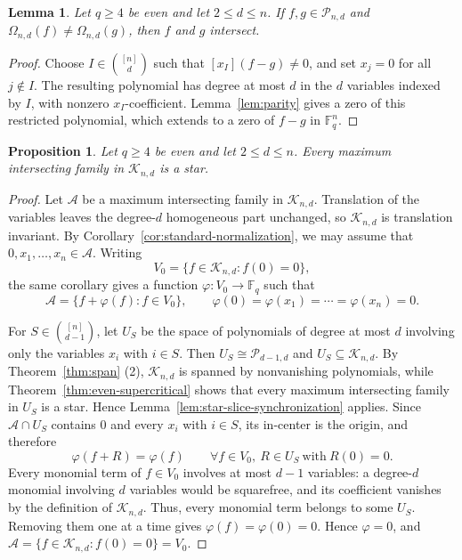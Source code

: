 \documentclass[12pt,reqno]{amsart}
\newtheorem{lem}[thm]{Lemma}
\newtheorem{prop}[thm]{Proposition}
\theoremstyle{definition}
\newcommand{\F}{\mathbb{F}}
\newcommand{\cA}{\mathcal A}
\newcommand{\cP}{\mathcal P}
\begin{document}
\begin{lem}
\label{lem:even-distinct-fibers}
Let $q\geq 4$ be even and let $2\leq d \leq n$. 
If $f,g\in\cP_{n,d}$ and $\Omega_{n,d}(f)\neq\Omega_{n,d}(g)$, then $f$ and
$g$ intersect.
\end{lem}

\begin{proof}
Choose $I\in\binom{[n]}{d}$ such that $[x_I](f-g)\neq0$, and set $x_j=0$ for all $j\notin I$. The resulting polynomial has
degree at most $d$ in the $d$ variables indexed by $I$, with nonzero $x_I$-coefficient. Lemma~\ref{lem:parity} gives a zero of this
restricted polynomial, which extends to a zero of $f-g$ in $\F_q^n$.
\end{proof}


\begin{prop}
\label{prop:even-fiber-rigidity}
Let $q\geq4$ be even and let $2\leq d\leq n$. Every maximum
intersecting family in $\mathcal K_{n,d}$ is a star.
\end{prop}

\begin{proof}
Let $\cA$ be a maximum intersecting family in $\mathcal K_{n,d}$. Translation of the variables leaves the degree-$d$ homogeneous part unchanged, so $\mathcal K_{n,d}$ is translation invariant. By Corollary~\ref{cor:standard-normalization}, we may assume that $0,x_1,\ldots,x_n\in\cA$. Writing
\[
V_0=\{f\in\mathcal K_{n,d}:f(0)=0\},
\]
the same corollary gives a function
$\varphi\colon V_0\to\F_q$ such that
\[
\cA=\{f+\varphi(f):f\in V_0\},
  \qquad \varphi(0)=\varphi(x_1)=\cdots=\varphi(x_n)=0.
\]

For $S\in\binom{[n]}{d-1}$, let $U_S$ be the space of polynomials of degree at most $d$ involving only the variables $x_i$ with $i\in S$. Then $U_S\cong\cP_{d-1,d}$ and $U_S\subseteq\mathcal K_{n,d}$. By Theorem~\ref{thm:span} (2), $\mathcal K_{n,d}$ is spanned
by nonvanishing polynomials, while Theorem~\ref{thm:even-supercritical} shows that every maximum intersecting family in $U_S$ is a star. Hence Lemma~\ref{lem:star-slice-synchronization} applies. Since $\cA\cap U_S$ contains $0$ and every $x_i$ with $i\in S$, its in-center is the origin, and therefore
\[
\varphi(f+R)=\varphi(f)
  \qquad
  \forall f\in V_0,\ R\in U_S \ \text{with}\ R(0)=0.
\]
Every monomial term of $f\in V_0$ involves at most $d-1$ variables: a degree-$d$ monomial involving $d$ variables would be squarefree, and its coefficient vanishes by the definition of $\mathcal K_{n,d}$. Thus, every monomial term belongs to some $U_S$. Removing them one at a time gives 
$\varphi(f)=\varphi(0)=0$. Hence $\varphi=0$, and $\cA=\{f\in\mathcal K_{n,d}:f(0)=0\}=V_0$. 
\end{proof}
\end{document}
